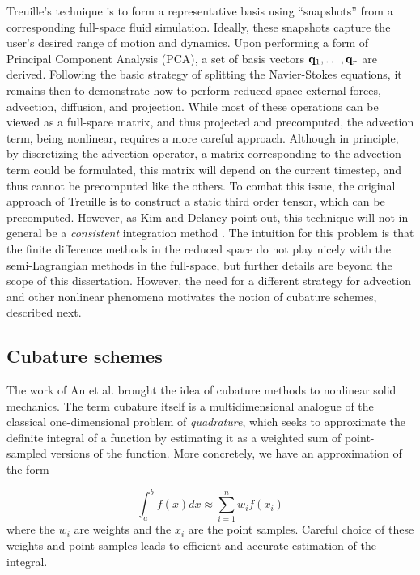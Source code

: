 Treuille's technique is to form a representative basis using ``snapshots'' from a corresponding full-space fluid simulation. Ideally, these snapshots capture the 
user's desired range of motion and dynamics. Upon performing a form of Principal Component Analysis (PCA), a set of basis vectors $\mathbf{q}_1, \dots, \mathbf{q}_r$ are derived. Following the basic strategy of splitting the Navier-Stokes equations, it remains then to demonstrate how to perform reduced-space external forces,
advection, diffusion, and projection. While most of these operations can be viewed as a full-space matrix, and thus projected and precomputed, the advection
term, being nonlinear, requires a more careful approach. Although in principle, by discretizing the advection operator, a matrix corresponding
to the advection term could be formulated, this matrix will depend on the current timestep, and thus cannot be precomputed like the others. To combat this issue,
the original approach of Treuille is to construct a static third order tensor, which can be precomputed. However, as Kim and Delaney point out, this technique
will not in general be a {\em consistent} integration method \cite{Kim2013, Carlberg11}. The intuition for this problem is that the finite difference methods in the reduced space do not play nicely with the semi-Lagrangian methods in the full-space, but further details are beyond the scope of this dissertation. However, the need for a different strategy for advection and other nonlinear phenomena motivates the notion of cubature schemes, described next.

\subsection{Cubature schemes}
The work of An et al. \cite{An:2008} brought the idea of cubature methods to nonlinear solid mechanics. The term cubature itself is a multidimensional analogue
of the classical one-dimensional problem of {\em quadrature}, which seeks to approximate the definite integral of a function by estimating it as a weighted 
sum of point-sampled versions of the function. More concretely, we have an approximation of the form

\begin{equation}
\int_a^b f(x) dx \approx \sum_{i=1}^n w_i f(x_i)
\end{equation}
where the $w_i$ are weights and the $x_i$ are the point samples. Careful choice of these weights and point samples leads to efficient and accurate estimation of the integral.

